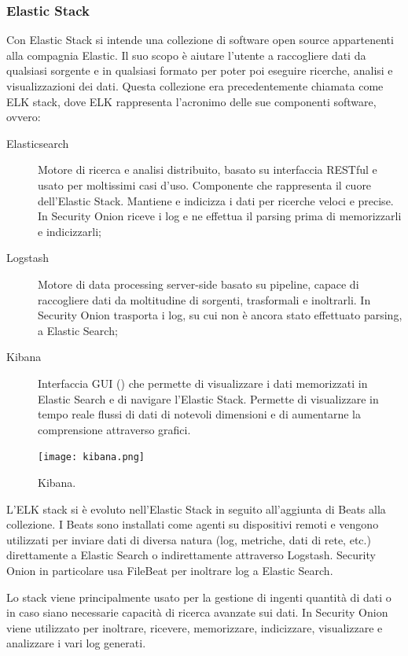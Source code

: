 \subsubsection*{Elastic Stack}
Con Elastic Stack \cite{elasticstack} si intende una collezione di software open source appartenenti alla compagnia Elastic.
Il suo scopo è aiutare l'utente a raccogliere dati da qualsiasi sorgente e in qualsiasi formato per poter poi eseguire ricerche, analisi e visualizzazioni dei dati.
Questa collezione era precedentemente chiamata come ELK stack, dove ELK rappresenta l'acronimo delle sue componenti software, ovvero:
\begin{description}
    \item [Elasticsearch] Motore di ricerca e analisi distribuito, basato su interfaccia RESTful e usato per moltissimi casi d'uso. Componente che rappresenta il cuore dell'Elastic Stack. Mantiene e indicizza i  dati per ricerche veloci e precise.
    In Security Onion riceve i log e ne effettua il parsing prima di memorizzarli e indicizzarli;
    \item [Logstash] Motore di data processing server-side basato su pipeline, capace di raccogliere dati da moltitudine di sorgenti, trasformali e inoltrarli.
    In Security Onion trasporta i log, su cui non è ancora stato effettuato parsing,  a Elastic Search;
    \item [Kibana] Interfaccia GUI () che permette di visualizzare i dati memorizzati in Elastic Search e di navigare l'Elastic Stack. Permette di visualizzare in tempo reale flussi di dati di notevoli dimensioni e di aumentarne la comprensione attraverso grafici.
\end{description}

\begin{figure}[hbtp]
    \centering
    \texttt{[image: kibana.png]}
    \caption{Kibana.}
    \label{fig:kibana}
\end{figure}


L'ELK stack si è evoluto nell'Elastic Stack in seguito all'aggiunta di Beats alla collezione.
I Beats sono installati come agenti su dispositivi remoti e vengono utilizzati per inviare dati di diversa natura (log, metriche, dati di rete, etc.) direttamente a Elastic Search  o indirettamente attraverso Logstash. Security Onion in particolare usa FileBeat per inoltrare log a Elastic Search.

Lo stack viene principalmente usato per la gestione di ingenti quantità di dati o in caso siano necessarie capacità di ricerca avanzate sui dati. In Security Onion viene utilizzato per inoltrare, ricevere, memorizzare, indicizzare, visualizzare e analizzare i vari log generati.

